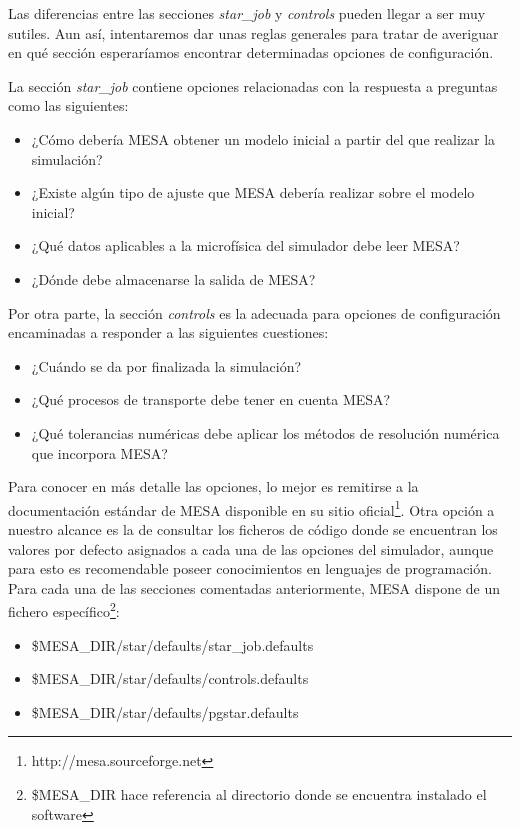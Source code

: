 Las diferencias entre las secciones \textit{star\_job} y \textit{controls} pueden llegar a ser muy sutiles. Aun así, intentaremos dar unas reglas generales para tratar de averiguar en qué sección esperaríamos encontrar determinadas opciones de configuración.\par

La sección \textit{star\_job} contiene opciones relacionadas con la respuesta a preguntas como las siguientes:
\begin{itemize}
    \item ¿Cómo debería MESA obtener un modelo inicial a partir del que realizar la simulación?
    \item ¿Existe algún tipo de ajuste que MESA debería realizar sobre el modelo inicial?
    \item ¿Qué datos aplicables a la microfísica del simulador debe leer MESA?
    \item ¿Dónde debe almacenarse la salida de MESA?
\end{itemize}

Por otra parte, la sección \textit{controls} es la adecuada para opciones de configuración encaminadas a responder a las siguientes cuestiones:
\begin{itemize}
    \item ¿Cuándo se da por finalizada la simulación?
    \item ¿Qué procesos de transporte debe tener en cuenta MESA?
    \item ¿Qué tolerancias numéricas debe aplicar los métodos de resolución numérica que incorpora MESA?
\end{itemize}

Para conocer en más detalle las opciones, lo mejor es remitirse a la documentación estándar de MESA disponible en su sitio oficial\footnote{http://mesa.sourceforge.net}. Otra opción a nuestro alcance es la de consultar los ficheros de código donde se encuentran los valores por defecto asignados a cada una de las opciones del simulador, aunque para esto es recomendable poseer conocimientos en lenguajes de programación. Para cada una de las secciones comentadas anteriormente, MESA dispone de un fichero específico\footnote{\$MESA\_DIR hace referencia al directorio donde se encuentra instalado el software}:

\begin{itemize}
    \item \$MESA\_DIR/star/defaults/star\_job.defaults
    \item \$MESA\_DIR/star/defaults/controls.defaults
    \item \$MESA\_DIR/star/defaults/pgstar.defaults
\end{itemize}

